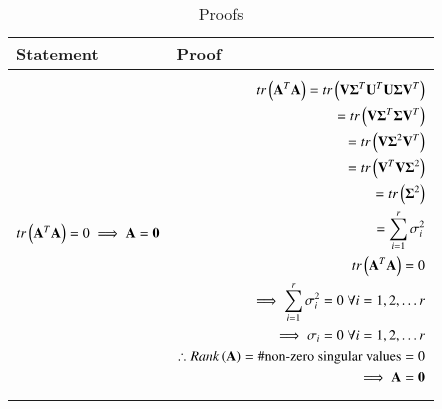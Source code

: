 \documentclass[journal,12pt,twocolumn]{IEEEtran}
\numberwithin{table}{section}
\begin{document}
\begin{table*}[ht!]
\begin{center}
\begin{tabular}{|l|l|}
\hline
\textbf{Statement} & \textbf{Proof} \\[0.5ex]
\hline
$tr\left(\mathbf{A}^T\mathbf{A}\right)=0 \implies \mathbf{A}=\mathbf{0}$ & 
 \parbox{10cm}{\begin{align}
    tr\left(\mathbf{A}^T\mathbf{A}\right)=tr\left(\mathbf{V}\mathbf{\Sigma}^T\mathbf{U}^T\mathbf{U}\mathbf{\Sigma}\mathbf{V}^T\right)\\
	=tr\left(\mathbf{V}\mathbf{\Sigma}^T\mathbf{\Sigma}\mathbf{V}^T\right)\\
	=tr\left(\mathbf{V}\mathbf{\Sigma}^2\mathbf{V}^T\right)\\
	=tr\left(\mathbf{V}^T\mathbf{V}\mathbf{\Sigma}^2\right)\\
	=tr\left(\mathbf{\Sigma}^2\right)\\
	=\sum\limits_{i=1}^r \sigma_{i}^2 \\ 
	 tr\left(\mathbf{A}^T\mathbf{A}\right)=0 \\
	\implies \sum\limits_{i=1}^r \sigma_{i}^2=0 \; \forall i=1,2,\dots r\\
	\implies \sigma_i=0 \; \forall i=1,2,\dots r \\
	\therefore Rank\left(\mathbf{A}\right)=\# \text{non-zero singular values}=0\\
	\implies \mathbf{A}=\mathbf{0}
\end{align}}
\\ [0.5ex] 
\hline
$\vec{A}=\vec{0} \implies  tr\brak{\vec{A}^T\vec{A}}=0$
& \parbox{10cm}{\begin{align}
    \vec{A}=\vec{0}\\
    \implies \vec{A}^T\vec{A}=\vec{0}\\
    \implies tr\brak{\vec{A}^T\vec{A}}=0
\end{align}}
\\ [0.5ex] 
\hline
\end{tabular}
\caption{Proofs}
\label{table:2}
\end{center}
\vspace{-0.5cm}
\end{table*}
\end{document}
